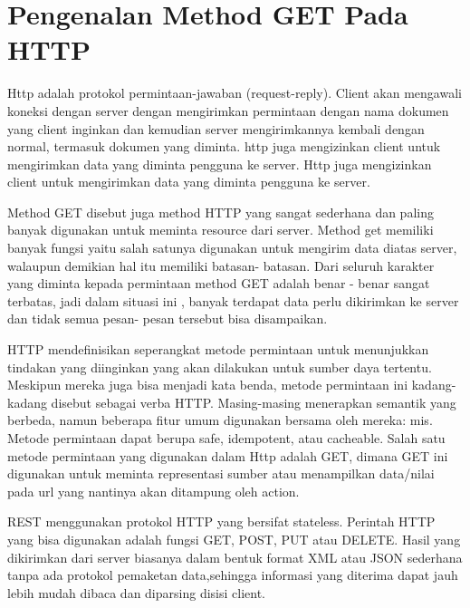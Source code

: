 
\section{Pengenalan Method GET Pada HTTP}
Http adalah protokol permintaan-jawaban (request-reply). Client akan mengawali koneksi dengan server dengan mengirimkan permintaan 
dengan nama dokumen yang client inginkan dan kemudian server mengirimkannya kembali dengan normal, termasuk dokumen yang diminta. http 
juga mengizinkan client untuk mengirimkan data yang diminta pengguna ke server. Http juga mengizinkan client untuk mengirimkan data 
yang diminta pengguna ke server. 

Method GET disebut juga method HTTP yang sangat sederhana dan paling banyak digunakan untuk meminta resource dari server. Method get 
memiliki banyak fungsi yaitu salah satunya digunakan untuk mengirim data diatas server, walaupun demikian hal itu memiliki batasan-
batasan. Dari seluruh karakter yang diminta kepada permintaan method GET  adalah benar - benar sangat terbatas, jadi dalam situasi ini , banyak terdapat data perlu dikirimkan ke server  dan tidak semua pesan- pesan tersebut bisa disampaikan.

HTTP mendefinisikan seperangkat metode permintaan untuk menunjukkan tindakan yang diinginkan yang akan dilakukan untuk sumber daya 
tertentu.
Meskipun mereka juga bisa menjadi kata benda, metode permintaan ini kadang-kadang disebut sebagai verba HTTP. Masing-masing menerapkan 
semantik yang berbeda, namun beberapa fitur umum digunakan bersama oleh mereka: mis. Metode permintaan dapat berupa safe, idempotent, 
atau cacheable. Salah satu metode permintaan yang digunakan dalam Http adalah GET, dimana GET ini digunakan untuk meminta representasi 
sumber atau menampilkan data/nilai pada url yang nantinya akan ditampung oleh action.

REST menggunakan protokol HTTP yang bersifat stateless. Perintah HTTP yang bisa digunakan adalah fungsi GET, POST, PUT atau 
DELETE. Hasil yang dikirimkan dari server biasanya dalam bentuk format XML atau JSON sederhana tanpa ada protokol pemaketan  
data,sehingga informasi yang diterima dapat jauh lebih mudah dibaca dan diparsing disisi client.

